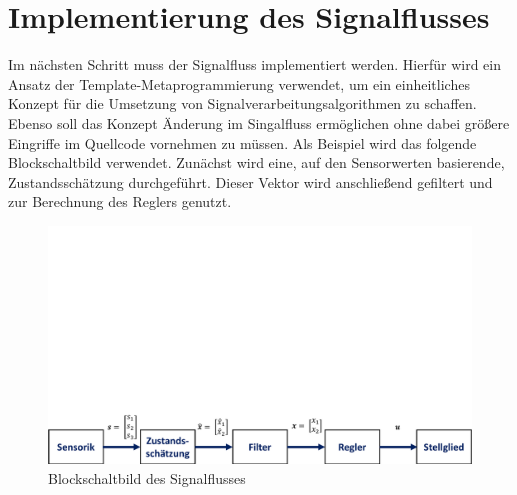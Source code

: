 \section{Implementierung des Signalflusses}
Im nächsten Schritt muss der Signalfluss implementiert werden. Hierfür wird ein Ansatz der Template-Metaprogrammierung verwendet, um ein einheitliches Konzept für die Umsetzung von Signalverarbeitungsalgorithmen zu schaffen. Ebenso soll das Konzept Änderung im Singalfluss ermöglichen ohne dabei größere Eingriffe im Quellcode vornehmen zu müssen. Als Beispiel wird das folgende Blockschaltbild verwendet.
Zunächst wird eine, auf den Sensorwerten basierende, Zustandsschätzung durchgeführt. Dieser Vektor wird anschließend gefiltert und zur Berechnung des Reglers genutzt.
\begin{figure}[!h]
\centering
\includegraphics[width=0.9\linewidth, trim={0cm 0cm 0cm 14cm}, clip]{img/SW_1_Signalfluss_BSB.pdf}
\caption{Blockschaltbild des Signalflusses}
\end{figure}

